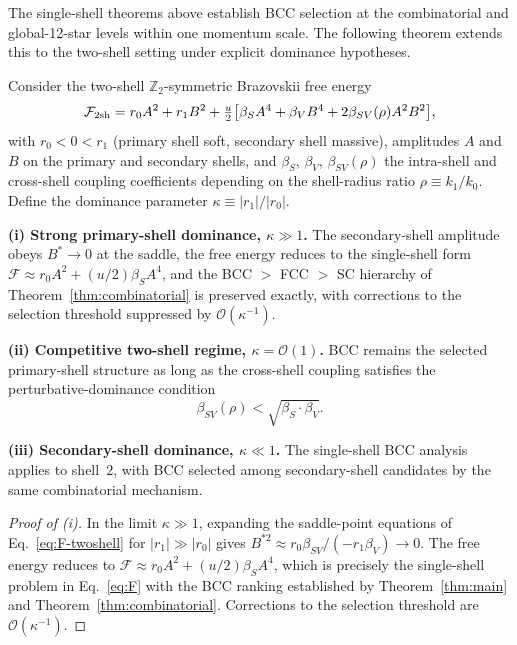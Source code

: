 The single-shell theorems above establish BCC selection at the
combinatorial and global-12-star levels within one momentum scale.
The following theorem extends this to the two-shell setting under
explicit dominance hypotheses.

\begin{theorem}
\label{thm:multishell}
Consider the two-shell $\mathbb{Z}_2$-symmetric Brazovskii free energy
\begin{equation}
\mathcal{F}_{2{\rm sh}} = r_0 A^2 + r_1 B^2 + \tfrac{u}{2}\big[
\beta_S A^4 + \beta_V B^4 + 2 \beta_{SV}(\rho) A^2 B^2 \big],
\label{eq:F-twoshell}
\end{equation}
with $r_0 < 0 < r_1$ (primary shell soft, secondary shell massive),
amplitudes $A$ and $B$ on the primary and secondary shells, and
$\beta_S$, $\beta_V$, $\beta_{SV}(\rho)$ the intra-shell and
cross-shell coupling coefficients depending on the shell-radius ratio
$\rho \equiv k_1/k_0$. Define the dominance parameter
$\kappa \equiv |r_1|/|r_0|$.

\textbf{(i) Strong primary-shell dominance, $\kappa \gg 1$.}
The secondary-shell amplitude obeys $B^* \to 0$ at the saddle, the
free energy reduces to the single-shell form
$\mathcal{F} \approx r_0 A^2 + (u/2) \beta_S A^4$, and the BCC $>$
FCC $>$ SC hierarchy of Theorem~\ref{thm:combinatorial} is preserved
exactly, with corrections to the selection threshold suppressed by
$\mathcal{O}(\kappa^{-1})$.

\textbf{(ii) Competitive two-shell regime, $\kappa = \mathcal{O}(1)$.}
BCC remains the selected primary-shell structure as long as the
cross-shell coupling satisfies the perturbative-dominance condition
\begin{equation}
\beta_{SV}(\rho) < \sqrt{\beta_S \cdot \beta_V}.
\label{eq:PD}
\end{equation}

\textbf{(iii) Secondary-shell dominance, $\kappa \ll 1$.}
The single-shell BCC analysis applies to shell~$2$, with BCC selected
among secondary-shell candidates by the same combinatorial mechanism.
\end{theorem}

\begin{proof}[Proof of (i)]
In the limit $\kappa \gg 1$, expanding the saddle-point equations of
Eq.~\eqref{eq:F-twoshell} for $|r_1| \gg |r_0|$ gives
$B^{*2} \approx r_0 \beta_{SV} / (-r_1 \beta_V) \to 0$. The free
energy reduces to $\mathcal{F} \approx r_0 A^2 + (u/2) \beta_S A^4$,
which is precisely the single-shell problem in
Eq.~\eqref{eq:F} with the BCC ranking established by
Theorem~\ref{thm:main} and Theorem~\ref{thm:combinatorial}.
Corrections to the selection threshold are
$\mathcal{O}(\kappa^{-1})$.
\end{proof}

